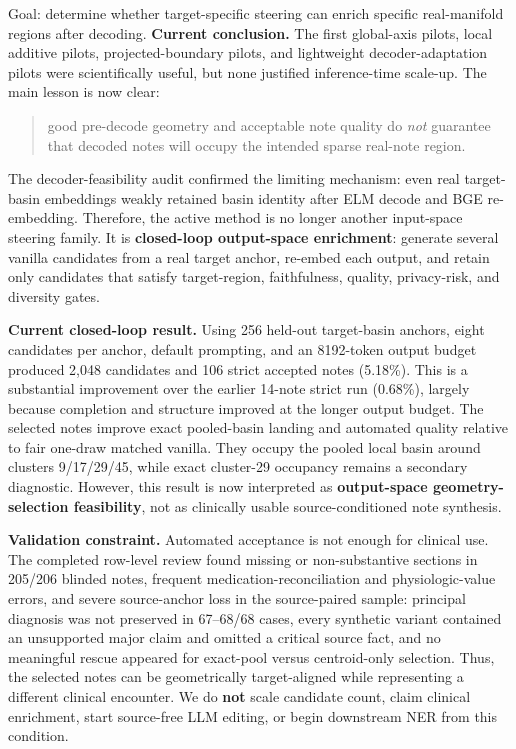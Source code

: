 \documentclass[11pt]{article}
\begin{document}
Goal: determine whether target-specific steering can enrich specific real-manifold regions after decoding.
\textbf{Current conclusion.}
The first global-axis pilots, local additive pilots, projected-boundary pilots, and lightweight decoder-adaptation pilots were scientifically useful, but none justified inference-time scale-up. The main lesson is now clear:
\begin{quote}
good pre-decode geometry and acceptable note quality do \emph{not} guarantee that decoded notes will occupy the intended sparse real-note region.
\end{quote}
The decoder-feasibility audit confirmed the limiting mechanism: even real target-basin embeddings weakly retained basin identity after ELM decode and BGE re-embedding. Therefore, the active method is no longer another input-space steering family. It is \textbf{closed-loop output-space enrichment}: generate several vanilla candidates from a real target anchor, re-embed each output, and retain only candidates that satisfy target-region, faithfulness, quality, privacy-risk, and diversity gates.

\textbf{Current closed-loop result.}
Using 256 held-out target-basin anchors, eight candidates per anchor, default prompting, and an 8192-token output budget produced 2,048 candidates and 106 strict accepted notes (5.18\%). This is a substantial improvement over the earlier 14-note strict run (0.68\%), largely because completion and structure improved at the longer output budget. The selected notes improve exact pooled-basin landing and automated quality relative to fair one-draw matched vanilla. They occupy the pooled local basin around clusters 9/17/29/45, while exact cluster-29 occupancy remains a secondary diagnostic. However, this result is now interpreted as \textbf{output-space geometry-selection feasibility}, not as clinically usable source-conditioned note synthesis.

\textbf{Validation constraint.}
Automated acceptance is not enough for clinical use. The completed row-level review found missing or non-substantive sections in 205/206 blinded notes, frequent medication-reconciliation and physiologic-value errors, and severe source-anchor loss in the source-paired sample: principal diagnosis was not preserved in 67--68/68 cases, every synthetic variant contained an unsupported major claim and omitted a critical source fact, and no meaningful rescue appeared for exact-pool versus centroid-only selection. Thus, the selected notes can be geometrically target-aligned while representing a different clinical encounter. We do \textbf{not} scale candidate count, claim clinical enrichment, start source-free LLM editing, or begin downstream NER from this condition.
\end{document}
